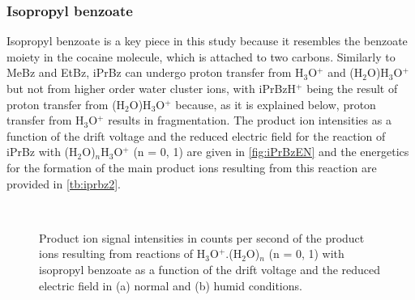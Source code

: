 \subsubsection{Isopropyl benzoate}
Isopropyl benzoate is a key piece in this study because it resembles the benzoate moiety in the cocaine molecule, which is attached to two carbons. 
%
Similarly to MeBz and EtBz, iPrBz can undergo proton transfer from H$_3$O$^+$ and (H$_2$O)H$_3$O$^+$ but not from higher order water cluster ions, with iPrBzH$^+$ being the result of  proton transfer from (H$_2$O)H$_3$O$^+$ because, as it is explained below, proton transfer from H$_3$O$^+$ results in fragmentation.
%
The product ion intensities as a function of the drift voltage and the reduced electric field for the reaction of iPrBz with (H$_2$O)$_n$H$_3$O$^+$ (n = 0, 1) are given in \autoref{fig:iPrBzEN} and the energetics for the formation of the main product ions resulting from this reaction are provided in \autoref{tb:iprbz2}.


\begin{figure}[htbp]
\centering
{}\\
\caption{Product ion signal intensities in counts per second of the product ions resulting from reactions of H$_3$O$^+$.(H$_2$O)$_n$ (n = 0, 1) with isopropyl benzoate as a function of the drift voltage and the reduced electric field in (a) normal and (b) humid conditions.} 
\label{fig:iPrBzEN}
\end{figure}


